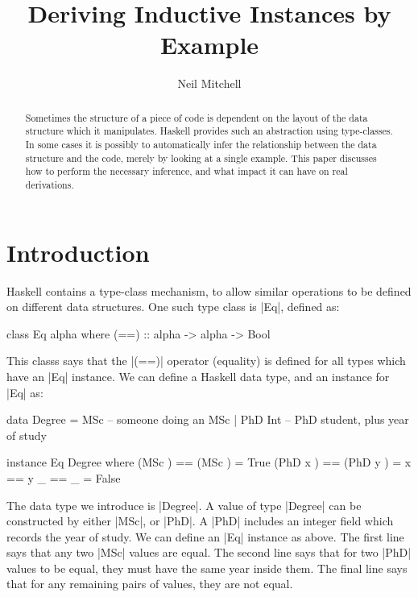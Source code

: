 \documentclass{llncs}
\begin{document}
\title{Deriving Inductive Instances by Example}
\author{Neil Mitchell}


\maketitle

\begin{abstract}
Sometimes the structure of a piece of code is dependent on the layout of the data structure which it manipulates. Haskell provides such an abstraction using type-classes. In some cases it is possibly to automatically infer the relationship between the data structure and the code, merely by looking at a single example. This paper discusses how to perform the necessary inference, and what impact it can have on real derivations.
\end{abstract}

\section{Introduction}

Haskell contains a type-class mechanism, to allow similar operations to be defined on different data structures. One such type class is |Eq|, defined as:

\begin{code}
class Eq alpha where
    (==) :: alpha -> alpha -> Bool
\end{code}

This classs says that the |(==)| operator (equality) is defined for all types which have an |Eq| instance. We can define a Haskell data type, and an instance for |Eq| as:

\begin{code}
data Degree  =  MSc        -- someone doing an MSc
             |  PhD Int    -- PhD student, plus year of study

instance Eq Degree where
    (MSc    )  == (MSc    )  = True
    (PhD x  )  == (PhD y  )  = x == y
    _          == _          = False
\end{code}

The data type we introduce is |Degree|. A value of type |Degree| can be constructed by either |MSc|, or |PhD|. A |PhD| includes an integer field which records the year of study. We can define an |Eq| instance as above. The first line says that any two |MSc| values are equal. The second line says that for two |PhD| values to be equal, they must have the same year inside them. The final line says that for any remaining pairs of values, they are not equal.
\end{document}
